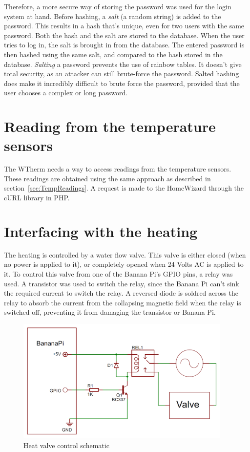 \documentclass[12pt,a4paper,final]{report}
\begin{document}
Therefore, a more secure way of storing the password was used for the login system at hand. Before hashing, a \textit{salt} (a random string) is added to the password. This results in a hash that's unique, even for two users with the same password. Both the hash and the salt are stored to the database. When the user tries to log in, the salt is brought in from the database. The entered password is then hashed using the same salt, and compared to the hash stored in the database. \textit{Salting} a password prevents the use of rainbow tables. It doesn't give total security, as an attacker can still brute-force the password. Salted hashing does make it incredibly difficult to brute force the password, provided that the user chooses a complex or long password.
\chapter{Reading from the temperature sensors} \label{chap:readTempSensors}
The WTherm needs a way to access readings from the temperature sensors. These readings are obtained using the same approach as described in section~\ref{sec:TempReadings}. A request is made to the HomeWizard through the cURL library in PHP. 

\chapter{Interfacing with the heating} \label{chap:heaterInterface}
The heating is controlled by a water flow valve. This valve is either closed (when no power is applied to it), or completely opened when 24 Volts AC is applied to it. To control this valve from one of the Banana Pi's GPIO pins, a relay was used. A transistor was used to switch the relay, since the Banana Pi can't sink the required current to switch the relay. A reversed diode is soldred across the relay to absorb the current from the collapsing magnetic field when the relay is switched off, preventing it from damaging the transistor or Banana Pi.
\begin{figure}[H]
  \begin{center}
      \includegraphics[width=0.95\textwidth]{ControlSchematic}
  \end{center}
  \caption{Heat valve control schematic}
\end{figure}
\end{document}
